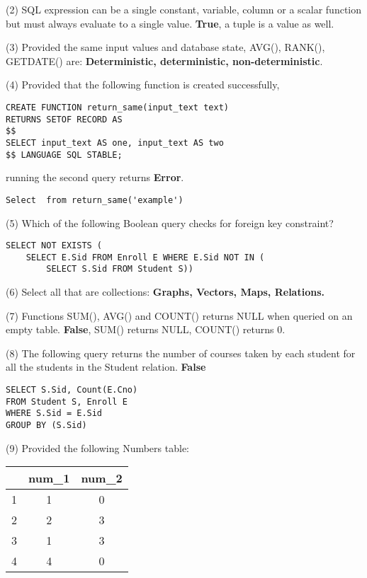 \documentclass[10pt,landscape]{article}
\newcommand{\ans}[1]{{\color{purple} \textbf{#1}}}
\begin{document}
\begin{multicols}{4}
(2) SQL expression can be a single constant, variable, column or a scalar function but must always evaluate to a single value. \ans{True}, a tuple is a value as well.

(3) Provided the same input values and database state, AVG(), RANK(), GETDATE() are: \ans{Deterministic, deterministic, non-deterministic}.

(4) Provided that the following function is created successfully, 

\begin{lstlisting}
CREATE FUNCTION return_same(input_text text)
RETURNS SETOF RECORD AS
$$
SELECT input_text AS one, input_text AS two
$$ LANGUAGE SQL STABLE;
\end{lstlisting}

running the second query returns \ans{Error}.

\begin{lstlisting}
Select  from return_same('example')
\end{lstlisting}

(5) Which of the following Boolean query checks for foreign key constraint?

\begin{lstlisting}
SELECT NOT EXISTS (
    SELECT E.Sid FROM Enroll E WHERE E.Sid NOT IN (
        SELECT S.Sid FROM Student S))
\end{lstlisting}

(6) Select all that are collections: \ans{Graphs, Vectors, Maps, Relations.}

(7) Functions SUM(), AVG() and COUNT() returns NULL when queried on an empty table. \ans{False}, SUM() returns NULL, COUNT() returns 0.

(8) The following query returns the number of courses taken by each student for all the students in the Student relation. \ans{False}

\begin{lstlisting}
SELECT S.Sid, Count(E.Cno)
FROM Student S, Enroll E
WHERE S.Sid = E.Sid
GROUP BY (S.Sid)
\end{lstlisting}

(9) Provided the following Numbers table:

\begin{center}
\begin{tabular}{ c | c | c }
   & num\_1 & num\_2 \\ 
 \hline
 1 & 1 & 0 \\
 \hline  
 2 & 2 & 3 \\  
 \hline
 3 & 1 & 3 \\  
 \hline
 4 & 4 & 0    
\end{tabular}
\end{center}


\end{multicols}
\end{document}
